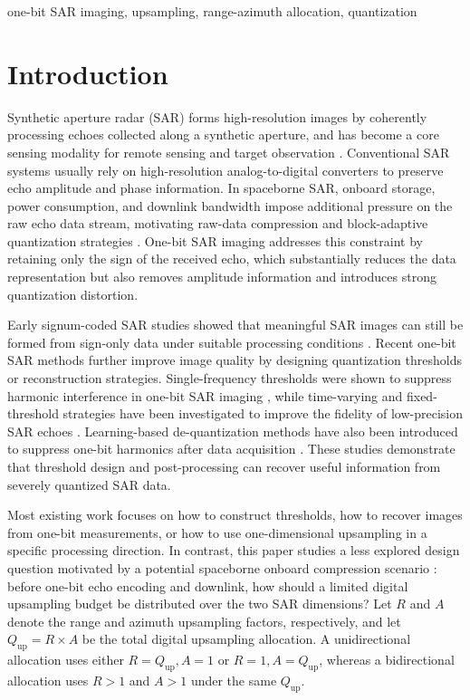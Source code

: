 \documentclass[conference]{IEEEtran}
\begin{document}
\begin{IEEEkeywords}
one-bit SAR imaging, upsampling, range-azimuth allocation, quantization
\end{IEEEkeywords}

\section{Introduction}

Synthetic aperture radar (SAR) forms high-resolution images by coherently processing echoes collected along a synthetic aperture, and has become a core sensing modality for remote sensing and target observation \cite{cumming2005sar,curlander1991sar}. Conventional SAR systems usually rely on high-resolution analog-to-digital converters to preserve echo amplitude and phase information. In spaceborne SAR, onboard storage, power consumption, and downlink bandwidth impose additional pressure on the raw echo data stream, motivating raw-data compression and block-adaptive quantization strategies \cite{kwok1989baq,attema2010fdbaq}. One-bit SAR imaging addresses this constraint by retaining only the sign of the received echo, which substantially reduces the data representation but also removes amplitude information and introduces strong quantization distortion.

Early signum-coded SAR studies showed that meaningful SAR images can still be formed from sign-only data under suitable processing conditions \cite{franceschetti1991signum}. Recent one-bit SAR methods further improve image quality by designing quantization thresholds or reconstruction strategies. Single-frequency thresholds were shown to suppress harmonic interference in one-bit SAR imaging \cite{zhao2019onebit}, while time-varying and fixed-threshold strategies have been investigated to improve the fidelity of low-precision SAR echoes \cite{demir2018onebit,zhao2021lowprecision,nie2025fixed}. Learning-based de-quantization methods have also been introduced to suppress one-bit harmonics after data acquisition \cite{si2023dequantization}. These studies demonstrate that threshold design and post-processing can recover useful information from severely quantized SAR data.

Most existing work focuses on how to construct thresholds, how to recover images from one-bit measurements, or how to use one-dimensional upsampling in a specific processing direction. In contrast, this paper studies a less explored design question motivated by a potential spaceborne onboard compression scenario \cite{magli2003lossy}: before one-bit echo encoding and downlink, how should a limited digital upsampling budget be distributed over the two SAR dimensions? Let $R$ and $A$ denote the range and azimuth upsampling factors, respectively, and let $Q_{\mathrm{up}}=R\times A$ be the total digital upsampling allocation. A unidirectional allocation uses either $R=Q_{\mathrm{up}},A=1$ or $R=1,A=Q_{\mathrm{up}}$, whereas a bidirectional allocation uses $R>1$ and $A>1$ under the same $Q_{\mathrm{up}}$.
\end{document}
